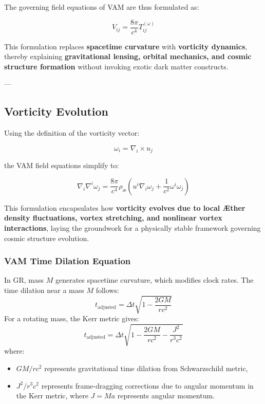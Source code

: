 The governing field equations of VAM are thus formulated as:

\begin{equation*}
    V_{ij} = \frac{8\pi}{c^4} T^{(\omega)}_{ij}
\end{equation*}


This formulation replaces \textbf{spacetime curvature} with \textbf{vorticity dynamics}, thereby explaining \textbf{gravitational lensing, orbital mechanics, and cosmic structure formation} without invoking exotic dark matter constructs.

---



\subsection{Vorticity Evolution}

Using the definition of the vorticity vector:

\begin{equation*}
    \omega_i = \nabla_i \times u_j
\end{equation*}

the VAM field equations simplify to:

\begin{equation*}
    \nabla_i \nabla^i \omega_j = \frac{8\pi}{c^4} \rho_\text{\ae} \left( u^i \nabla_i \omega_j + \frac{1}{c^2} \omega^i \omega_j \right)
\end{equation*}

This formulation encapsulates how \textbf{vorticity evolves due to local Æther density fluctuations, vortex stretching, and nonlinear vortex interactions}, laying the groundwork for a physically stable framework governing cosmic structure evolution.

\subsubsection*{VAM Time Dilation Equation}
In GR, mass $M$ generates spacetime curvature, which modifies clock rates. The time dilation near a mass $M$ follows:
\begin{equation*}
    t_{\text{adjusted}} = \Delta t \sqrt{1 - \frac{2GM}{rc^2}}
\end{equation*}
For a rotating mass, the Kerr metric gives:
\begin{equation*}
    t_{\text{adjusted}} = \Delta t \sqrt{1 - \frac{2GM}{r c^2} - \frac{J^2}{r^3 c^2}}
\end{equation*}
where:
\begin{itemize}
    \item $GM/r c^2$ represents gravitational time dilation from Schwarzschild metric,
    \item $J^2/r^3 c^2$ represents frame-dragging corrections due to angular momentum in the Kerr metric, where $J = M a$ represents angular momentum.
\end{itemize}

